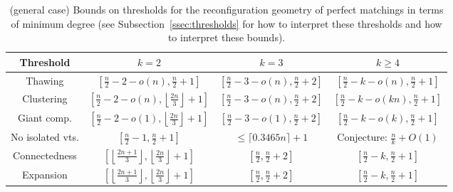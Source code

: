 \documentclass[11pt,a4paper]{article}
\theoremstyle{definition}
\begin{document}
\begin{table}
  \centering
  \begin{tabular}{|c|c|c|c|}
    \hline
    {\small Threshold} & $k=2$ & $k=3$ & $k \ge 4$\\
    \hline
    {\small Thawing} & $\left[\frac{n}2- 2 - o(n), \frac{n}2+1\right]$ & $\left[\frac{n}2-3-o(n), \frac{n}2+2\right]$ & $\left[\frac{n}2-k-o(n), \frac{n}2+1\right]$ \\
    {\small Clustering} & $\left[\frac{n}2-2-o(n), \left\lfloor
                    \frac{2n}3 \right\rfloor+1\right]$ & $\left[\frac{n}2-3-o(n), \frac{n}2+2\right]$ & $\left[\frac{n}2-k-o(kn), \frac{n}2+1\right]$\\
    {\small Giant comp.} & $\left[\frac{n}2-2-o(1), \left\lfloor
                    \frac{2n}3 \right\rfloor+1\right]$ & $\left[\frac{n}2-3-o(1), \frac{n}2+2\right]$ & $\left[\frac{n}2-k-o(k), \frac{n}2+1\right]$ \\
    {\small No isolated vts.}& $\left[\frac{n}2-1,\frac{n}2+1\right]$ & $\le \lceil0.3465 n\rceil +1$& {\small Conjecture:} $\frac{n}k +O(1)$%
    \\
    {\small Connectedness} & $\left[\left\lfloor \frac{2n+1}3 \right\rfloor,\left\lfloor
                    \frac{2n}3 \right\rfloor+1\right]$&$\left[\frac{n}2,
                                                        \frac{n}2+2\right]$ & $\left[ \frac{n}2 -k,\frac{n}2+1\right]$ \\
    {\small Expansion} & $\left[\left\lfloor \frac{2n+1}3 \right\rfloor,\left\lfloor
                    \frac{2n}3 \right\rfloor+1\right]$&$\left[\frac{n}2,
                                                        \frac{n}2+2\right]$ & $\left[ \frac{n}2-k,\frac{n}2+1\right]$ \\
    \hline
\end{tabular}
    \caption{(general case) Bounds on thresholds for the reconfiguration geometry
      of perfect matchings in terms of minimum degree (see
      Subsection~\ref{ssec:thresholds} for how to interpret these thresholds and how to interpret these bounds). 
      \label{tab:thresholds}}
\end{table}
\end{document}
